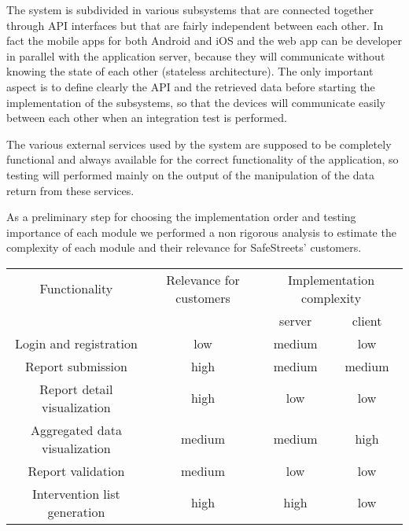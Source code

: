 The system is subdivided in various subsystems that are connected together through API interfaces but that are fairly independent between each other. In fact the mobile apps for both Android and iOS and the web app can be developer in parallel with the application server, because they will communicate without knowing the state of each other (stateless architecture). The only important aspect is to define clearly the API and the retrieved data before starting the implementation of the subsystems, so that the devices will communicate easily between each other when an integration test is performed.

The various external services used by the system are supposed to be completely functional and always available for the correct functionality of the application, so testing will performed mainly on the output of the manipulation of the data return from these services.

As a preliminary step for choosing the implementation order and testing importance of each module we performed a non rigorous analysis to estimate the complexity of each module and their relevance for SafeStreets' customers.

\bigskip
\begin{tabular}{|c|c|c|c|}
	\hline 
	Functionality & Relevance for customers & \multicolumn{2}{c|}{Implementation complexity} \\ 
	& & server & client \\
	\hline
	\hline 
	Login and registration & low & medium & low \\ 
	\hline 
	Report submission & high & medium & medium \\ 
	\hline 
	Report detail visualization & high & low & low \\ 
	\hline 
	Aggregated data visualization & medium & medium & high \\ 
	\hline 
	Report validation & medium & low & low \\ 
	\hline 
	Intervention list generation & high & high & low \\  
	\hline 
\end{tabular} 